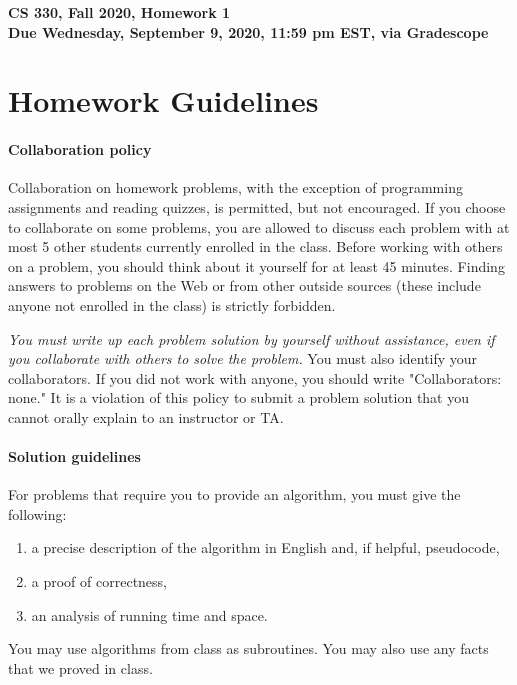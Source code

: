 \documentclass[11pt]{article}
\begin{document}
	
\begin{center}
\Large{\textbf{CS 330, Fall 2020, Homework 1 \\
Due Wednesday, September
  9, 2020, 11:59 pm EST, via Gradescope}}
\end{center}


\section*{Homework Guidelines}


\paragraph{Collaboration policy} Collaboration on homework problems, with the exception of
programming assignments and reading quizzes, is permitted, but not encouraged.
If you
choose to collaborate on some problems, you are allowed to discuss
each problem with at most 5 other students currently enrolled in the
class.
Before working with others on a problem, you should think about it
yourself for at least 45 minutes. Finding answers to problems on the
Web or from other outside sources (these include anyone not enrolled
in the class) is strictly forbidden.

{\em You must write up each problem solution by yourself without
assistance, even if you collaborate with others to solve the
problem.} You must also identify your collaborators. If you did not
work with anyone, you should write "Collaborators: none." It is a
violation of this policy to submit a problem solution that you
cannot orally explain to an instructor or TA.

\paragraph{Solution guidelines} For problems that require you to provide an algorithm, you must give the following:
    \begin{enumerate}
\item  a precise description of the algorithm in English and, if helpful, pseudocode,
\item a proof of correctness,
\item an analysis of running time and space.
\end{enumerate}
You may use algorithms from class as subroutines. You may also use any facts that we proved in class.
\end{document}
